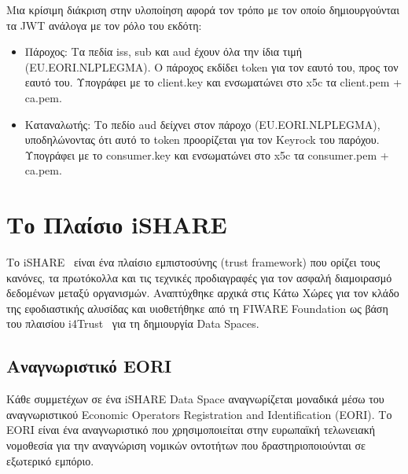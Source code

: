 Μια κρίσιμη διάκριση στην υλοποίηση αφορά τον τρόπο με τον οποίο
δημιουργούνται τα \textlatin{JWT} ανάλογα με τον ρόλο του εκδότη:

\begin{itemize}
    \item Πάροχος: Τα πεδία \textlatin{iss}, \textlatin{sub} και
    \textlatin{aud} έχουν όλα την ίδια τιμή (\textlatin{EU.EORI.NLPLEGMA}).
    Ο πάροχος εκδίδει \textlatin{token} για τον εαυτό του, προς τον
    εαυτό του. Υπογράφει με το \textlatin{client.key} και ενσωματώνει
    στο \textlatin{x5c} τα \textlatin{client.pem} + \textlatin{ca.pem}.
    \item Καταναλωτής: Το πεδίο \textlatin{aud} δείχνει στον
    πάροχο (\textlatin{EU.EORI.NLPLEGMA}), υποδηλώνοντας ότι αυτό το
    \textlatin{token} προορίζεται για τον \textlatin{Keyrock} του
    παρόχου. Υπογράφει με το \textlatin{consumer.key} και ενσωματώνει
    στο \textlatin{x5c} τα \textlatin{consumer.pem} + \textlatin{ca.pem}.
\end{itemize}

\section{Το Πλαίσιο \textlatin{iSHARE}}
\label{sec:ishare}

Το \textlatin{iSHARE}~\cite{ishare2023} είναι ένα πλαίσιο εμπιστοσύνης
(\textlatin{trust framework}) που ορίζει τους κανόνες, τα πρωτόκολλα
και τις τεχνικές προδιαγραφές για τον ασφαλή διαμοιρασμό δεδομένων
μεταξύ οργανισμών. Αναπτύχθηκε αρχικά στις Κάτω Χώρες για τον κλάδο
της εφοδιαστικής αλυσίδας και υιοθετήθηκε από τη \textlatin{FIWARE
Foundation} ως βάση του πλαισίου \textlatin{i4Trust}~\cite{i4trust2023}
για τη δημιουργία \textlatin{Data Spaces}.

\subsection{Αναγνωριστικό \textlatin{EORI}}
\label{subsec:eori}

Κάθε συμμετέχων σε ένα \textlatin{iSHARE Data Space} αναγνωρίζεται
μοναδικά μέσω του αναγνωριστικού \textlatin{Economic Operators Registration
and Identification (EORI)}. Το \textlatin{EORI} είναι ένα αναγνωριστικό
που χρησιμοποιείται στην ευρωπαϊκή τελωνειακή νομοθεσία για την
αναγνώριση νομικών οντοτήτων που δραστηριοποιούνται σε εξωτερικό εμπόριο.

